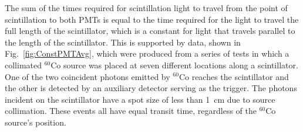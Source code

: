 \documentclass[%
 reprint,
 calc,
 amsmath,amssymb,
 aps,
 nofootinbib,
 linenumbers
]{revtex4-1}
\begin{document}
The sum of the times required for scintillation light to travel from the point of scintillation to both PMTs is equal to the time required for the light to travel the full length of the scintillator, which is a constant for light that travels parallel to the length of the scintillator.
This is supported by data, shown in Fig.~\ref{fig:ConstPMTAvg}, which were produced from a series of tests in which a collimated $^{60}$Co source was placed at seven different locations along a scintillator.
One of the two coincident photons emitted by $^{60}$Co reaches the scintillator and the other is detected by an auxiliary detector serving as the trigger. 
The photons incident on the scintillator have a spot size of less than 1~cm due to source collimation.
These events all have equal transit time, regardless of the $^{60}$Co source's position. %
\end{document}

